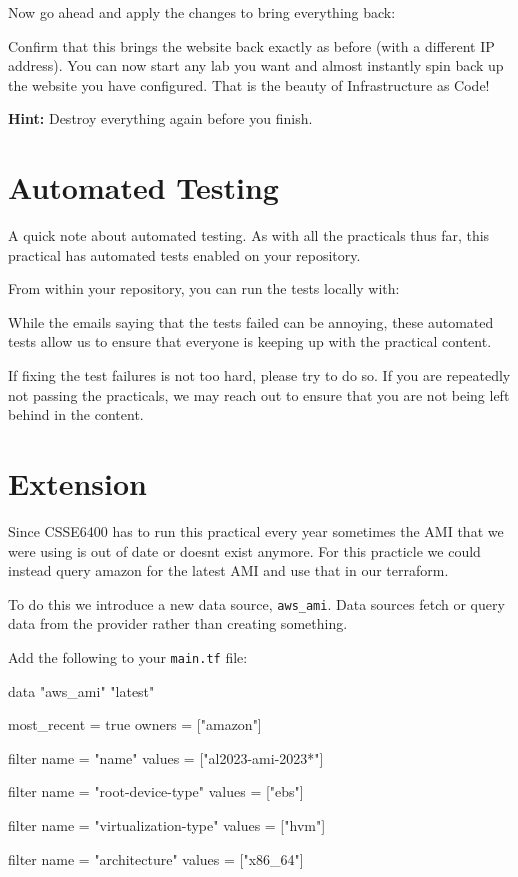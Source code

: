 \documentclass{csse4400}
\begin{document}
Now go ahead and apply the changes to bring everything back:

Confirm that this brings the website back exactly as before (with a different IP address).
You can now start any lab you want and almost instantly spin back up the website you have configured.
That is the beauty of Infrastructure as Code!

\textbf{Hint:} Destroy everything again before you finish.

\section{Automated Testing}
A quick note about automated testing.
As with all the practicals thus far,
this practical has automated tests enabled on your repository.

From within your repository, you can run the tests locally with:

While the emails saying that the tests failed can be annoying,
these automated tests allow us to ensure that everyone is keeping up with the practical content.

If fixing the test failures is not too hard,
please try to do so.
If you are repeatedly not passing the practicals,
we may reach out to ensure that you are not being left behind in the content.

\section{Extension}


Since CSSE6400 has to run this practical every year sometimes the AMI that we were using is out of date or doesnt exist anymore. For this practicle we could instead query amazon for the latest AMI and use that in our terraform.

To do this we introduce a new data source, \texttt{aws\_ami}. Data sources fetch or query data from the provider rather than creating something.

Add the following to your \texttt{main.tf} file:

\begin{code}[language=terraform,numbers=none]{}
data "aws_ami" "latest" {
  most_recent = true
  owners      = ["amazon"]

  filter {
    name   = "name"
    values = ["al2023-ami-2023*"]
  }

  filter {
    name   = "root-device-type"
    values = ["ebs"]
  }

  filter {
    name   = "virtualization-type"
    values = ["hvm"]
  }

  filter {
    name   = "architecture"
    values = ["x86_64"]
  }
}
\end{code}
\end{document}
